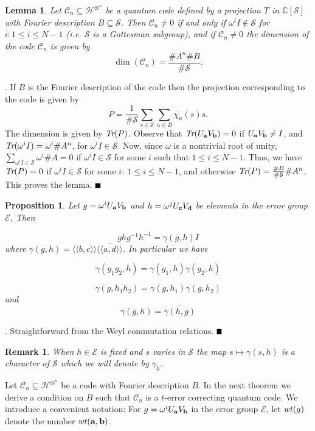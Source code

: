 \documentclass{Rinton-P9x6}
\newtheorem{lemma}[theorem]{Lemma}
\newtheorem{proposition}[theorem]{Proposition}
\newtheorem{remark}[theorem]{Remark}
\newcommand{\bproof}{\noindent{\it Proof}}
\newcommand{\eproof}{\hspace*{\fill}$\rule{2mm}{2mm}$~~~~~\bigskip}
\renewenvironment{proof}{\bproof. }{\eproof}
\newcommand{\Tr}{\mbox{\it Tr}}
\renewcommand{\a}{{\bf a}}
\renewcommand{\b}{{\bf b}}
\renewcommand{\c}{{\bf c}}
\renewcommand{\d}{{\bf d}}
\newcommand{\om}{{\omega}}
\newcommand{\wt}{{\it wt}}
\newcommand{\C}{{\ensuremath{\mathcal{C}}}}
\renewcommand{\S}{{\ensuremath{\mathcal{S}}}}
\newcommand{\Hin}{{\ensuremath{\mathcal{H}^{\otimes^n}}}}
\newcommand{\E}{{\ensuremath{\mathcal{E}}}}
\newcommand{\biangle}[1]{\langle\langle #1\rangle\rangle}
\begin{document}
\begin{lemma}{\label{dimlemma}}
  Let $\C_n\subseteq\Hin$ be a quantum code defined by a projection
  $T$ in $\mathbb{C}[\S]$ with Fourier description $B \subseteq \S$. Then
  $\C_n\neq 0$ if and only if $\om^iI\not\in\S$ for $i: 1\leq i\leq
  N-1$ (i.e. $\S$ is a Gottesman subgroup), and if $\C_n\neq 0$ the
  dimension of the code $\C_n$ is given by
\[ 
\dim(\C_n) =\frac{\#A^n \#B}{\#\S}.
\]
\end{lemma}

\begin{proof}
  If $B$ is the Fourier description of the code then the projection
  corresponding to the code is given by \[ P =\frac{1}{\#\S} \sum_{s
    \in \S} \sum_{u \in B} \overline{\chi_u}(s) s. \] The dimension is
  given by $\Tr(P)$.  Observe that $\Tr(U_{\a}V_{\b}) = 0$ if
  $U_{\a}V_{\b}\neq I$, and $\Tr(\om^iI)=\om^i\#A^n$, for
  $\om^iI\in\S$. Now, since $\om$ is a nontrivial root of unity,
  $\sum_{\om^iI\in\S} \om^i \# A =0 $ if $\om^iI\in\S$ for some $i$
  such that $1\leq i\leq N-1$. Thus, we have $\Tr(P)=0$ if
  $\om^iI\in\S$ for some $i:~1\leq i\leq N-1$, and otherwise
  $\Tr(P)=\frac{\#B}{\#\S}\#A^n$. This proves the lemma.
\end{proof}

\begin{proposition}
  Let $g = \omega^i U_{\a} V_\b$ and $h = \omega^j U_\c V_\d$ be
  elements in the error group $\E$. Then

  \[
  ghg^{-1}h^{-1} = \gamma(g,h) I
  \]
  where $\gamma(g,h) = \biangle{b,c} \overline{\biangle{a,d}}$. In particular
  we have 

  \[
  \gamma(g_1g_2,h) = \gamma(g_1,h)\gamma(g_2,h)
  \]

  \[
  \gamma(g,h_1 h_2) = \gamma(g,h_1) \gamma(g,h_2)
  \]
  and
  \[
  \gamma(g,h) = \overline{\gamma(h,g)}
  \]
\end{proposition}
\begin{proof} 
  Straightforward from the Weyl commutation relations.
\end{proof}
\begin{remark}\label{gammagremark}
  When $h \in \E$ is fixed and $s$ varies in $\S$ the map $s \mapsto
  \gamma(s,h)$ is a character of $\S$ which we will denote by
  $\gamma_h$.
\end{remark}

Let $\C_n\subseteq\Hin$ be a code with Fourier description $B$. In the
next theorem we derive a condition on $B$ such that $\C_n$ is a
$t$-error correcting quantum code. We introduce a convenient notation:
For $g=\om^iU_{\a}V_{\b}$ in the error group $\E$, let $\wt(g)$ denote
the number $\wt(\a,\b)$.
\end{document}
